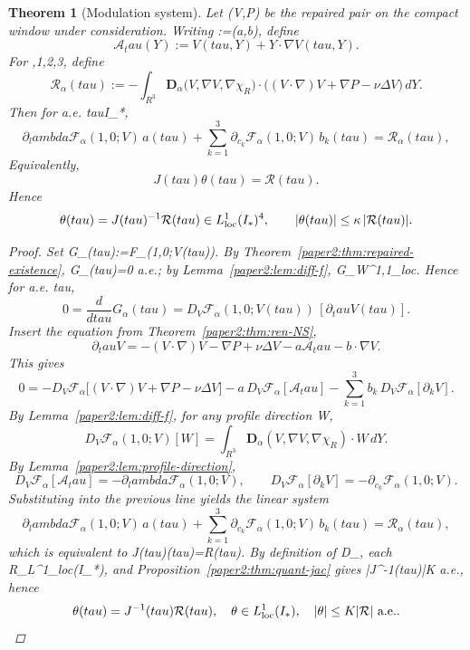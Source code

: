 \documentclass[11pt]{amsart}
\def\({}%
\def\){}%
\def\mathrm#1{#1}%
\def\mathbb#1{#1}%
\def\tau{tau}%
\def\lambda{lambda}%
\theoremstyle{plain}
\newtheorem{theorem}{Theorem}[section]
\theoremstyle{definition}
\theoremstyle{remark}
\newcommand{\dd}{\mathrm d}
\newcommand{\RR}{\mathbb R}
\newcommand{\nn}{\nabla}
\begin{document}
\begin{theorem}[Modulation system]\label{paper2:thm:mod-sys}
Let \((V,P)\) be the repaired pair on the compact window under consideration.
Writing \(\theta:=(a,b)\), define
\[
\mathcal A_\tau(Y):=V(\tau,Y)+Y\cdot\nn V(\tau,Y).
\]
For \(,1,2,3\), define
\[
\mathcal R_\alpha(\tau):=
-\int_{\RR^3}\mathbf D_\alpha\bigl(V,\nn V,\nabla\chi_R\bigr)
\cdot\bigl((V\cdot\nn)V+\nabla P-\nu\Delta V\bigr)\,\dd Y.
\]
Then for a.e. \(\tau\in I_*\),
\[
\partial_\lambda\mathcal F_\alpha(1,0;V)\,a(\tau)
+\sum_{k=1}^3\partial_{c_k}\mathcal F_\alpha(1,0;V)\,b_k(\tau)
=\mathcal R_\alpha(\tau),
\]
Equivalently,
\[
J(\tau)\theta(\tau)=\mathcal R(\tau).
\]
Hence
\[
\theta(\tau)=J(\tau)^{-1}\mathcal R(\tau)\in L^1_{\rm loc}(I_*)^4,
\qquad |\theta(\tau)|\le \kappa\,|\mathcal R(\tau)|.
\]
\begin{proof}
Set \(G_\alpha(\tau):=\mathcal F_\alpha(1,0;V(\tau))\). By Theorem~\ref{paper2:thm:repaired-existence},
\(G_\alpha(\tau)=0\) a.e.; by Lemma~\ref{paper2:lem:diff-f}, \(G_\alpha\in W^{1,1}_{\rm loc}\).
Hence for a.e. \(\tau\),
\[
0=\frac{d}{d\tau}G_\alpha(\tau)
=D_V\mathcal F_\alpha(1,0;V(\tau))\,[\partial_\tau V(\tau)].
\]
Insert the equation from Theorem~\ref{paper2:thm:ren-NS},
\[
\partial_\tau V=-(V\cdot\nn)V-\nabla P+\nu\Delta V-a\mathcal A_\tau-b\cdot\nn V.
\]
This gives
\[
0=-D_V\mathcal F_\alpha\bigl[(V\cdot\nn)V+\nabla P-\nu\Delta V\bigr]
-a\,D_V\mathcal F_\alpha[\mathcal A_\tau]
-\sum_{k=1}^3b_k\,D_V\mathcal F_\alpha[\partial_kV].
\]
By Lemma~\ref{paper2:lem:diff-f}, for any profile direction \(W\),
\[
D_V\mathcal F_\alpha(1,0;V)[W]=\int_{\RR^3}\mathbf D_\alpha(V,\nn V,\nabla\chi_R)\cdot W\,\dd Y.
\]
By Lemma~\ref{paper2:lem:profile-direction},
\[
D_V\mathcal F_\alpha[\mathcal A_\tau]=-\partial_\lambda\mathcal F_\alpha(1,0;V),\qquad
D_V\mathcal F_\alpha[\partial_kV]=-\partial_{c_k}\mathcal F_\alpha(1,0;V).
\]
Substituting into the previous line yields the linear system
\[
\partial_\lambda\mathcal F_\alpha(1,0;V)\,a(\tau)
+\sum_{k=1}^3\partial_{c_k}\mathcal F_\alpha(1,0;V)\,b_k(\tau)
=\mathcal R_\alpha(\tau),
\]
which is equivalent to \(J(\tau)\theta(\tau)=\mathcal R(\tau)\).
By definition of \(\mathbf D_\alpha\), each \(\mathcal R_\alpha\in L^1_{\rm loc}(I_*)\), and
Proposition~\ref{paper2:thm:quant-jac} gives \(|J^{-1}(\tau)|\le K\) a.e., hence
\[\theta(\tau)=J^{-1}(\tau)\mathcal R(\tau),\quad 
\theta\in L^1_{\rm loc}(I_*),\quad |\theta|\le K|\mathcal R|\text{ a.e.}.\]
\end{proof}
\end{theorem}
\end{document}
